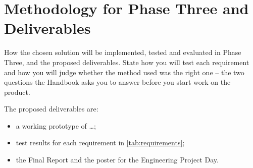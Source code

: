 \section{Methodology for Phase Three and Deliverables}
\label{sec:phase-three}

\begin{guidance}
How the chosen solution will be implemented, tested and evaluated in
Phase Three, and the proposed deliverables. State how you will test each
requirement and how you will judge whether the method used was the right
one -- the two questions the Handbook asks you to answer before you start
work on the product.
\end{guidance}

The proposed deliverables are:
\begin{itemize}
  \item a working prototype of \ldots;
  \item test results for each requirement in \cref{tab:requirements};
  \item the Final Report and the poster for the Engineering Project Day.
\end{itemize}
